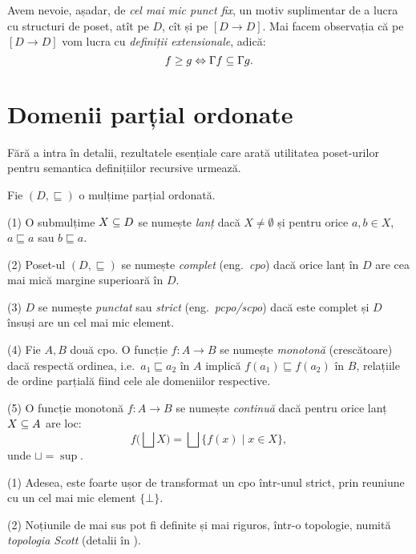 Avem nevoie, așadar, de \emph{cel mai mic punct fix}, un motiv suplimentar de a lucra
cu structuri de poset, atît pe $ D $, cît și pe $ [ D \to D ] $. Mai facem observația
că pe $ [D \to D] $ vom lucra cu \emph{definiții extensionale}, adică:
\[
  f \geq g \Leftrightarrow \Gamma f \subseteq \Gamma g.
\]


\section{Domenii parțial ordonate}

\indent\indent Fără a intra în detalii, rezultatele esențiale care arată utilitatea
poset-urilor pentru semantica definițiilor recursive urmează.

\begin{definition}\label{def:cpo}
  Fie $ (D, \sqsubseteq) $ o mulțime parțial ordonată.

  (1) O submulțime $ X \subseteq D $ se numește \emph{lanț} dacă $ X \neq \emptyset $ și
  pentru orice $ a, b \in X $, $ a \sqsubseteq a $ sau $ b \sqsubseteq a $.

  (2) Poset-ul $ (D, \sqsubseteq) $ se numește \emph{complet} (eng.\ \emph{cpo}) dacă
  orice lanț în $ D $ are cea mai mică margine superioară în $ D $.

  (3) $ D $ se numește \emph{punctat} sau \emph{strict} (eng.\ \emph{pcpo/scpo}) dacă
  este complet și $ D $ însuși are un cel mai mic element.

  (4) Fie $ A, B $ două cpo. O funcție $ f : A \to B $ se numește \emph{monotonă}
  (crescătoare) dacă respectă ordinea, i.e.\ $ a_1 \sqsubseteq a_2 $ în $ A $ implică
  $ f(a_1) \sqsubseteq f(a_2) $ în $ B $, relațiile de ordine parțială fiind cele
  ale domeniilor respective.

  (5) O funcție monotonă $ f : A \to B $ se numește \emph{continuă} dacă pentru orice
  lanț $ X \subseteq A $ are loc:
  \[
    f \Big( \bigsqcup X \Big) = \bigsqcup \{ f(x) \mid x \in X \},
  \]
  unde $ \sqcup = \sup $.
\end{definition}

\begin{remark}\label{rk:top}
  (1) Adesea, este foarte ușor de transformat un cpo într-unul strict, prin reuniune
  cu un cel mai mic element $ \{ \bot \} $.

  (2) Noțiunile de mai sus pot fi definite și mai riguros, într-o topologie, numită
  \emph{topologia Scott} (detalii în \cite{abrj}).
\end{remark}

